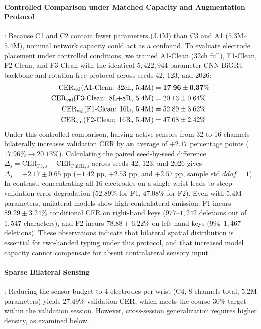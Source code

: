 \documentclass{article}
\begin{document}
\paragraph{Controlled Comparison under Matched Capacity and Augmentation Protocol}:
Because C1 and C2 contain fewer parameters ($3.1\text{M}$) than C3 and A1 ($5.3\text{M}$--$5.4\text{M}$), nominal network capacity could act as a confound. To evaluate electrode placement under controlled conditions, we trained A1-Clean (32ch full), F1-Clean, F2-Clean, and F3-Clean with the identical $5{,}422{,}944$-parameter CNN-BiGRU backbone and rotation-free protocol across seeds 42, 123, and 2026:
\begin{align}
    \text{CER}_{\text{val}}(\text{A1-Clean: 32ch, 5.4M}) &= \mathbf{17.96 \pm 0.37\%} \notag \\
    \text{CER}_{\text{val}}(\text{F3-Clean: 8L+8R, 5.4M}) &= 20.13 \pm 0.64\% \notag \\
    \text{CER}_{\text{val}}(\text{F1-Clean: 16L, 5.4M}) &= 52.89 \pm 3.62\% \notag \\
    \text{CER}_{\text{val}}(\text{F2-Clean: 16R, 5.4M}) &= 47.08 \pm 2.42\%
\end{align}
Under this controlled comparison, halving active sensors from 32 to 16 channels bilaterally increases validation CER by an average of $+2.17$ percentage points ($17.96\% \to 20.13\%$). Calculating the paired seed-by-seed difference $\Delta_s = \text{CER}_{\text{F3}, s} - \text{CER}_{\text{Full32}, s}$ across seeds 42, 123, and 2026 gives $\Delta_s = +2.17 \pm 0.65\text{ pp}$ ($+1.42\text{ pp}$, $+2.53\text{ pp}$, and $+2.57\text{ pp}$, sample std $ddof=1$). In contrast, concentrating all 16 electrodes on a single wrist leads to steep validation error degradation ($52.89\%$ for F1, $47.08\%$ for F2). Even with 5.4M parameters, unilateral models show high contralateral omission: F1 incurs $89.29 \pm 3.24\%$ conditional CER on right-hand keys ($977$--$1{,}242$ deletions out of $1{,}547$ characters), and F2 incurs $78.88 \pm 6.22\%$ on left-hand keys ($994$--$1{,}467$ deletions). These observations indicate that bilateral spatial distribution is essential for two-handed typing under this protocol, and that increased model capacity cannot compensate for absent contralateral sensory input.

\paragraph{Sparse Bilateral Sensing}:
Reducing the sensor budget to $4$ electrodes per wrist (C4, $8$ channels total, $5.2\text{M}$ parameters) yields $\mathbf{27.49\%}$ validation CER, which meets the course $30\%$ target within the validation session. However, cross-session generalization requires higher density, as examined below.
\end{document}
